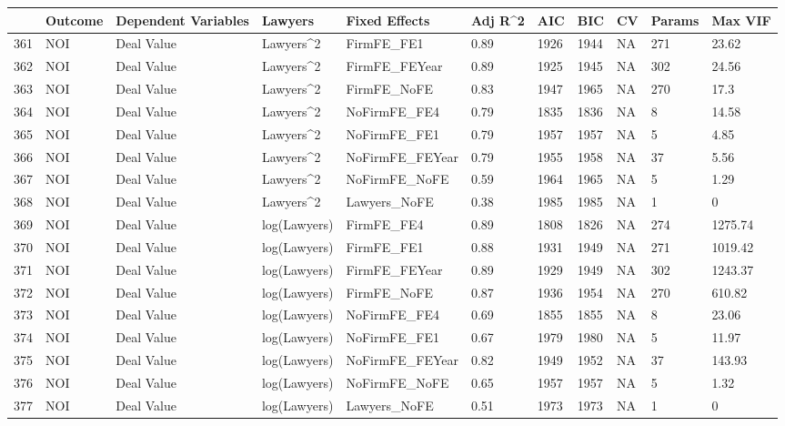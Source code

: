 \documentclass{article}
\begin{document}
\begin{table}[H]
\centering
\begin{tabular}{rllllllllll}
  \hline
 & Outcome & Dependent Variables & Lawyers & Fixed Effects & Adj R^2 & AIC & BIC & CV & Params & Max VIF \\ 
  \hline
361 & NOI & Deal Value & Lawyers^2 & FirmFE\_FE1 & 0.89 & 1926 & 1944 & NA & 271 & 23.62 \\ 
  362 & NOI & Deal Value & Lawyers^2 & FirmFE\_FEYear & 0.89 & 1925 & 1945 & NA & 302 & 24.56 \\ 
  363 & NOI & Deal Value & Lawyers^2 & FirmFE\_NoFE & 0.83 & 1947 & 1965 & NA & 270 & 17.3 \\ 
  364 & NOI & Deal Value & Lawyers^2 & NoFirmFE\_FE4 & 0.79 & 1835 & 1836 & NA & 8 & 14.58 \\ 
  365 & NOI & Deal Value & Lawyers^2 & NoFirmFE\_FE1 & 0.79 & 1957 & 1957 & NA & 5 & 4.85 \\ 
  366 & NOI & Deal Value & Lawyers^2 & NoFirmFE\_FEYear & 0.79 & 1955 & 1958 & NA & 37 & 5.56 \\ 
  367 & NOI & Deal Value & Lawyers^2 & NoFirmFE\_NoFE & 0.59 & 1964 & 1965 & NA & 5 & 1.29 \\ 
  368 & NOI & Deal Value & Lawyers^2 & Lawyers\_NoFE & 0.38 & 1985 & 1985 & NA & 1 & 0 \\ 
  369 & NOI & Deal Value & log(Lawyers) & FirmFE\_FE4 & 0.89 & 1808 & 1826 & NA & 274 & 1275.74 \\ 
  370 & NOI & Deal Value & log(Lawyers) & FirmFE\_FE1 & 0.88 & 1931 & 1949 & NA & 271 & 1019.42 \\ 
  371 & NOI & Deal Value & log(Lawyers) & FirmFE\_FEYear & 0.89 & 1929 & 1949 & NA & 302 & 1243.37 \\ 
  372 & NOI & Deal Value & log(Lawyers) & FirmFE\_NoFE & 0.87 & 1936 & 1954 & NA & 270 & 610.82 \\ 
  373 & NOI & Deal Value & log(Lawyers) & NoFirmFE\_FE4 & 0.69 & 1855 & 1855 & NA & 8 & 23.06 \\ 
  374 & NOI & Deal Value & log(Lawyers) & NoFirmFE\_FE1 & 0.67 & 1979 & 1980 & NA & 5 & 11.97 \\ 
  375 & NOI & Deal Value & log(Lawyers) & NoFirmFE\_FEYear & 0.82 & 1949 & 1952 & NA & 37 & 143.93 \\ 
  376 & NOI & Deal Value & log(Lawyers) & NoFirmFE\_NoFE & 0.65 & 1957 & 1957 & NA & 5 & 1.32 \\ 
  377 & NOI & Deal Value & log(Lawyers) & Lawyers\_NoFE & 0.51 & 1973 & 1973 & NA & 1 & 0 \\ 

\end{tabular}
\end{table}
\end{document}
